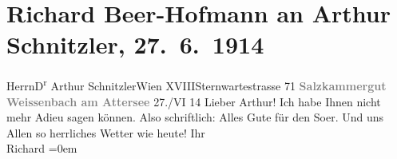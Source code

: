 

         
         \renewcommand{\erwaehntePersonen}{Personen: Richard Beer-Hofmann}
         \renewcommand{\erwaehnteOrte}{Orte: Salzkammergut, Sternwartestraße, Weißenbach am Attersee, Wien, XVIII., Währing}
         \renewcommand{\erwaehnteWerke}{}
               \section[Richard Beer-Hofmann an Arthur Schnitzler, 27. 6. 1914]{ Richard Beer-Hofmann an Arthur Schnitzler, 27. 6. 1914}\nopagebreak{}\rehead{ }\begin{ledgroupsized}[t]{13cm}\normalsize\beginnumbering \toendnotes[C]{\smallbreak\pagebreak[2]} 
\pstart{}{\pb}Herrn\pend{}\pstart{}D\textsuperscript{r} Arthur Schnitzler\pend{}\pstart{}Wien XVIII\pend{}\pstart{}Sternwartestrasse 71\pend{}{\bigskip}\pstart
           \noindent{}\centering{}{\pb}\textcolor{gray}{\textbf{Salzkammergut}}\pend
           \pstart
           \noindent{}\centering{}\textcolor{gray}{\textbf{Weissenbach am Attersee}}\pend
           \pstart
           \raggedleft{}{\pb}27./VI 14\pend
           \pstart{}Lieber Arthur!\pend\pstart
           Ich habe Ihnen nicht mehr Adieu sagen können.\pend
           \pstart
           Also schriftlich: Alles Gute für den So{\geminationm}er. Und uns
               Allen so herrliches Wetter wie heute!\pend
           \pstart
           Ihr{\\[\baselineskip]}\spacefill\mbox{Richard}\pend
           \leftskip=0em{}
         
         \endnumbering{}\end{ledgroupsized}  \newcommand{\dateiname}{L02184}\newcommand{\titel}{Richard Beer-Hofmann an Arthur Schnitzler, 27. 6. 1914}\newcommand{\editorInnen}{Martin Anton Müller und Gerd-Hermann Susen}
      